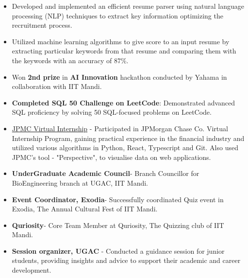 \documentclass[10pt,a4paper,ragged2e]{altacv}
\begin{document}
\begin{fullwidth}
\begin{itemize}
 \item Developed and implemented an efficient resume parser using natural language processing (NLP) techniques to extract key information optimizing
the recruitment process.
 \item Utilized machine learning algorithms to give score to an input resume by extracting particular keywords from that resume and comparing them with the keywords with an accuracy of 87\%.
\end{itemize}


\begin{itemize}


\item Won {\bf 2nd prize} in {\bf AI Innovation} hackathon conducted by Yahama in collaboration with IIT Mandi.
\item {\bf Completed SQL 50 Challenge on LeetCode}: Demonstrated advanced SQL proficiency by solving 50 SQL-focused problems on LeetCode.
\item {\href{https://github.com/dhruvik3610/JPMC_certificate}{JPMC Virtual Internship} } - Participated in JPMorgan Chase Co. Virtual Internship Program, gaining practical experience in the financial industry and utilized various algorithms in Python, React, Typescript and Git. Also used JPMC's tool - "Perspective", to visualise data on web applications.

\end{itemize}



\begin{itemize}

\item {\bf UnderGraduate Academic Council}- Branch Councillor for BioEngineering branch at UGAC, IIT Mandi.
\item {\bf Event Coordinator, Exodia}- Successfully coordinated Quiz event in Exodia, The Annual Cultural Fest of IIT Mandi.
\item {\bf Quriosity}- Core Team Member at Quriosity, The Quizzing club of IIT Mandi.
\item {\bf Session organizer, UGAC} - Conducted a guidance session for junior students, providing insights and advice to support their academic and career development.

\end{itemize}







\end{fullwidth}
\end{document}
